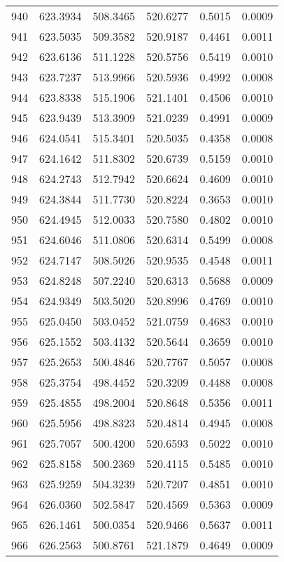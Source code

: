 \documentclass{article}
\begin{document}
\begin{longtable}{|c|c|c|c|c|c|}
940 & 623.3934 & 508.3465 & 520.6277 & 0.5015 & 0.0009 \\
941 & 623.5035 & 509.3582 & 520.9187 & 0.4461 & 0.0011 \\
942 & 623.6136 & 511.1228 & 520.5756 & 0.5419 & 0.0010 \\
943 & 623.7237 & 513.9966 & 520.5936 & 0.4992 & 0.0008 \\
944 & 623.8338 & 515.1906 & 521.1401 & 0.4506 & 0.0010 \\
945 & 623.9439 & 513.3909 & 521.0239 & 0.4991 & 0.0009 \\
946 & 624.0541 & 515.3401 & 520.5035 & 0.4358 & 0.0008 \\
947 & 624.1642 & 511.8302 & 520.6739 & 0.5159 & 0.0010 \\
948 & 624.2743 & 512.7942 & 520.6624 & 0.4609 & 0.0010 \\
949 & 624.3844 & 511.7730 & 520.8224 & 0.3653 & 0.0010 \\
950 & 624.4945 & 512.0033 & 520.7580 & 0.4802 & 0.0010 \\
951 & 624.6046 & 511.0806 & 520.6314 & 0.5499 & 0.0008 \\
952 & 624.7147 & 508.5026 & 520.9535 & 0.4548 & 0.0011 \\
953 & 624.8248 & 507.2240 & 520.6313 & 0.5688 & 0.0009 \\
954 & 624.9349 & 503.5020 & 520.8996 & 0.4769 & 0.0010 \\
955 & 625.0450 & 503.0452 & 521.0759 & 0.4683 & 0.0010 \\
956 & 625.1552 & 503.4132 & 520.5644 & 0.3659 & 0.0010 \\
957 & 625.2653 & 500.4846 & 520.7767 & 0.5057 & 0.0008 \\
958 & 625.3754 & 498.4452 & 520.3209 & 0.4488 & 0.0008 \\
959 & 625.4855 & 498.2004 & 520.8648 & 0.5356 & 0.0011 \\
960 & 625.5956 & 498.8323 & 520.4814 & 0.4945 & 0.0008 \\
961 & 625.7057 & 500.4200 & 520.6593 & 0.5022 & 0.0010 \\
962 & 625.8158 & 500.2369 & 520.4115 & 0.5485 & 0.0010 \\
963 & 625.9259 & 504.3239 & 520.7207 & 0.4851 & 0.0010 \\
964 & 626.0360 & 502.5847 & 520.4569 & 0.5363 & 0.0009 \\
965 & 626.1461 & 500.0354 & 520.9466 & 0.5637 & 0.0011 \\
966 & 626.2563 & 500.8761 & 521.1879 & 0.4649 & 0.0009 \\

\end{longtable}
\end{document}
